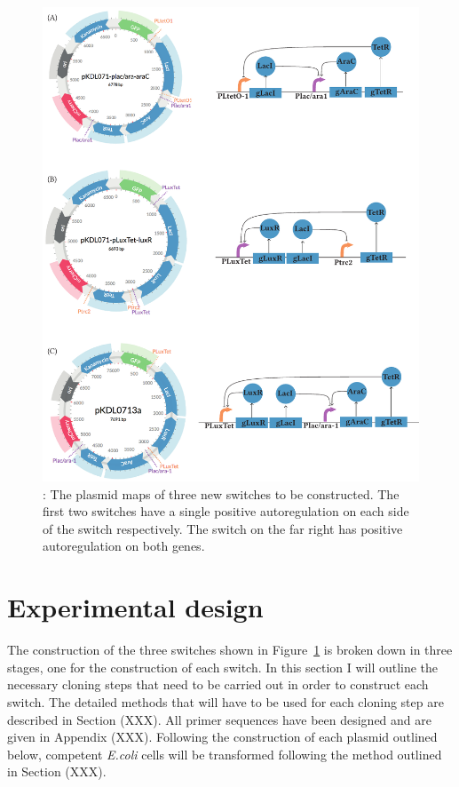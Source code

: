 \begin{figure}[htbp]
	\begin{center}
		\includegraphics[scale=0.7]{../../chapters/chapterDesignSwitches/images/final-plasmids.pdf}
		\caption[LoF caption]{\label{fig:finalpl}: The plasmid maps of three new switches to be constructed. The first two switches have a single positive autoregulation on each side of the switch respectively. The switch on the far right has positive autoregulation on both genes. }
	\end{center}
\end{figure}

\section{Experimental design}

The construction of the three switches shown in Figure~\ref{fig:finalpl} is broken down in three stages, one for the construction of each switch. In this section I will outline the necessary cloning steps that need to be carried out in order to construct each switch. The detailed methods that will have to be used for each cloning step are described in Section (XXX). All primer sequences have been designed and are given in Appendix (XXX). Following the construction of each plasmid outlined below, competent \textit{E.coli} cells will be transformed following the method outlined in Section (XXX).

